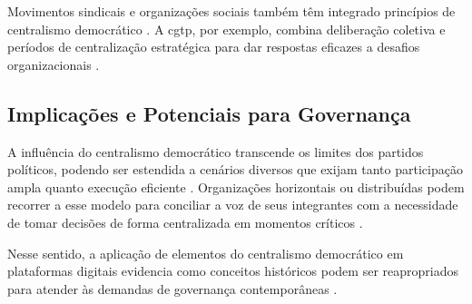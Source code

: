 Movimentos sindicais e organizações sociais também
têm integrado princípios de centralismo democrático \cite{CGTPStatutes}. A
\gls{cgtp}, por exemplo, combina deliberação coletiva e períodos de
centralização estratégica para dar respostas eficazes a desafios
organizacionais \cite{CGTPStatutes}.

\subsection{Implicações e Potenciais para Governança}
\label{sec:implicacoes_potenciais}

A influência do centralismo democrático transcende os limites dos
partidos políticos, podendo ser estendida a cenários diversos que
exijam tanto participação ampla quanto execução eficiente \cite{ACenturyofDemocraticCentralism}.
Organizações horizontais ou distribuídas podem recorrer a esse modelo
para conciliar a voz de seus integrantes com a necessidade de tomar
decisões de forma centralizada em momentos críticos
\cite{StillaCenturyoftheChineseModel,ACenturyofDemocraticCentralism}.

Nesse sentido, a aplicação de elementos do centralismo democrático em
plataformas digitais evidencia como conceitos históricos podem ser
reapropriados para atender às demandas de governança contemporâneas \cite{Colbac}.